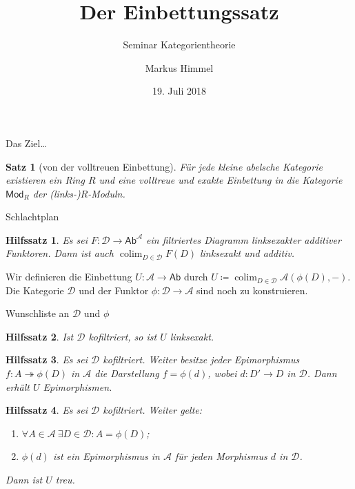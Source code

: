 \documentclass[usenames, dvipsnames]{beamer}
\title{Der Einbettungssatz}
\subtitle{Seminar Kategorientheorie}
\author{Markus Himmel}
\date{19. Juli 2018}
\newtheorem{hilfssatz}{Hilfssatz}
\newtheorem{satz}{Satz}
\newcommand\ccat\mathsf
\newcommand\cat\mathcal
\DeclareMathOperator{\colim}{colim}
\begin{document}
	\begin{frame}
		\maketitle
	\end{frame}
	\begin{frame}{Das Ziel\ldots}
		\begin{satz}[von der volltreuen Einbettung]
			Für jede kleine abelsche Kategorie existieren ein Ring $R$ und eine volltreue
			und exakte Einbettung in die Kategorie $\ccat{Mod}_R$ der (links-)$R$-Moduln.
		\end{satz}
	\end{frame}
	\begin{frame}{Schlachtplan}
		\begin{hilfssatz}
			Es sei $F\colon\cat{D}\to\ccat{Ab}^{\cat{A}}$ ein filtriertes Diagramm
			linksexakter additiver Funktoren. Dann ist auch $\colim_{D\in\cat{D}} F(D)$
			linksexakt und additiv.
		\end{hilfssatz}\pause
		\begin{definition}[Die Einbettung in $\ccat{Ab}$]
			Wir definieren die Einbettung $U\colon\cat{A}\to\ccat{Ab}$ durch
			$U\coloneqq \colim_{D\in\cat{D}}\cat{A}(\phi(D), {-})$.
			Die Kategorie $\cat{D}$ und der Funktor $\phi\colon\cat{D}\to\cat{A}$ sind
			noch zu konstruieren.
		\end{definition}
	\end{frame}
	\begin{frame}{Wunschliste an $\cat{D}$ und $\phi$}
		\begin{hilfssatz}
			Ist $\cat{D}$ kofiltriert, so ist $U$ linksexakt.
		\end{hilfssatz}\pause
		\begin{hilfssatz}
			Es sei $\cat{D}$ kofiltriert. Weiter besitze jeder Epimorphismus
			$f\colon A\twoheadrightarrow\phi(D)$ in $\cat{A}$ die Darstellung $f = \phi(d)$, wobei
			$d\colon D'\to D$ in $\cat{D}$. Dann erhält $U$ Epimorphismen.
		\end{hilfssatz}\pause
		\begin{hilfssatz}
			Es sei $\cat{D}$ kofiltriert. Weiter gelte:
			\begin{enumerate}
				\item $\forall A\in\cat{A}\ \exists D\in\cat{D}: A=\phi(D)$;
				\item $\phi(d)$ ist ein Epimorphismus in $\cat{A}$ für jeden Morphismus $d$ in $\cat{D}$.
			\end{enumerate}
			Dann ist $U$ treu.
		\end{hilfssatz}
	\end{frame}
\end{document}
